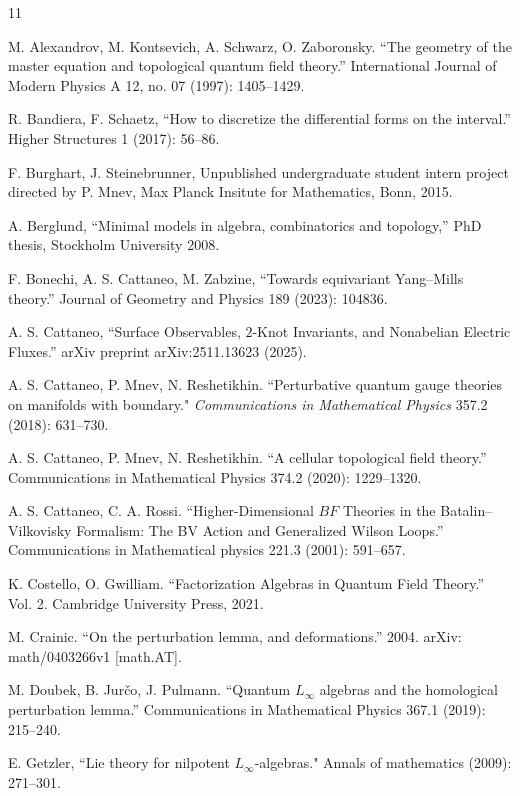 \documentclass{amsart}
\theoremstyle{plain} %
\theoremstyle{definition}
\theoremstyle{remark}
\begin{document}
\begin{thebibliography}{11}

M. Alexandrov, M. Kontsevich, A. Schwarz, O. Zaboronsky. ``The geometry of the master equation and topological quantum field theory.'' International Journal of Modern Physics A 12, no. 07 (1997): 1405--1429.

 R. Bandiera, F. Schaetz, ``How to discretize the differential forms on the interval.'' Higher Structures 1 (2017): 56--86.

 F. Burghart, J. Steinebrunner, Unpublished undergraduate student intern project directed by P. Mnev, Max Planck Insitute for Mathematics, Bonn, 2015.

 A. Berglund, ``Minimal models in algebra, combinatorics and topology,'' PhD thesis, Stockholm University 2008.

F. Bonechi, A. S. Cattaneo,  M. Zabzine, ``Towards equivariant Yang--Mills theory.'' Journal of Geometry and Physics 189 (2023): 104836.

A. S. Cattaneo, ``Surface Observables, $2$-Knot Invariants, and Nonabelian Electric Fluxes.'' arXiv preprint arXiv:2511.13623 (2025).

A. S. Cattaneo, P. Mnev, N. Reshetikhin. ``Perturbative quantum gauge theories on manifolds with boundary." \textit{Communications in Mathematical Physics} 357.2 (2018): 631--730.

A. S. Cattaneo, P. Mnev, N. Reshetikhin. ``A cellular topological field theory.'' Communications in Mathematical Physics 374.2 (2020): 1229--1320.

A. S. Cattaneo, C. A. Rossi. ``Higher-Dimensional $BF$ Theories in the Batalin–Vilkovisky Formalism: The BV Action and Generalized Wilson Loops.'' Communications in Mathematical physics 221.3 (2001): 591--657.

K. Costello, O. Gwilliam. ``Factorization Algebras in Quantum Field Theory.'' Vol. 2. Cambridge University Press, 2021.

M. Crainic. ``On the perturbation lemma, and deformations.''
2004. arXiv: math/0403266v1 [math.AT].

M. Doubek, B. Jur\v{c}o, J. Pulmann. ``Quantum $L_\infty$ algebras and the homological perturbation lemma.'' Communications in Mathematical Physics 367.1 (2019): 215--240.

E. Getzler, ``Lie theory for nilpotent $L_\infty$-algebras." Annals of mathematics (2009): 271--301.


\end{thebibliography}
\end{document}
